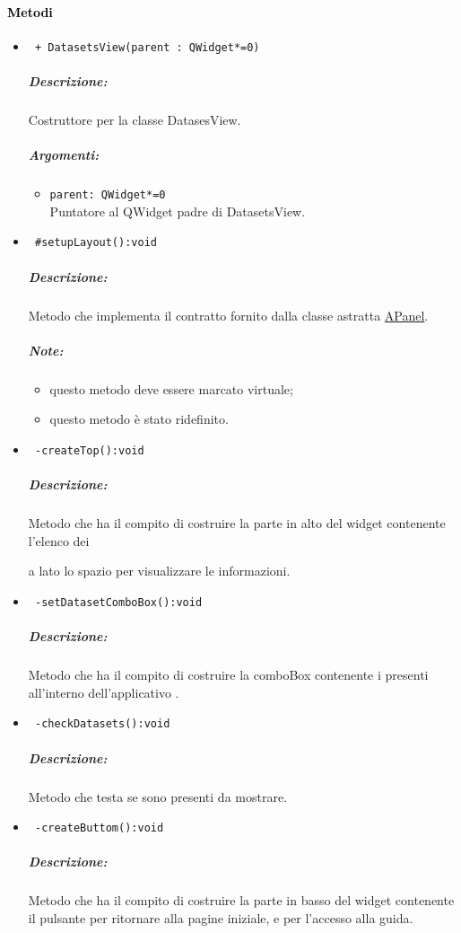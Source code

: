\paragraph{\textcolor{black}{Metodi\\}}
\begin{itemize}
\item\color{blue}\verb! + DatasetsView(parent : QWidget*=0)!
\subparagraph{Descrizione:}
\color{black}Costruttore per la classe DatasesView. 
\subparagraph{Argomenti:}
\begin{itemize}
\item \color{RoyalPurple}\verb!parent: QWidget*=0  !\\ Puntatore al QWidget padre di DatasetsView.
\end{itemize}

\item\color{blue}\verb! #setupLayout():void!
\color{black}
\subparagraph{Descrizione:} Metodo che implementa il contratto fornito dalla classe astratta \hyperref[speAPanel]{APanel}.
\subparagraph{Note:}
\begin{itemize}
\item questo metodo deve essere marcato virtuale;
\item questo metodo è stato ridefinito.
\end{itemize}
 
\item\color{blue}\verb! -createTop():void!
\color{black}
\subparagraph{Descrizione:} Metodo che ha il compito di costruire la parte in alto del widget contenente l'elenco dei \subject e a lato lo spazio per visualizzare le informazioni.
 
\item\color{blue}\verb! -setDatasetComboBox():void!
\color{black}
\subparagraph{Descrizione:} Metodo che ha il compito di costruire la comboBox contenente i \dataset{} presenti all'interno dell'applicativo \project. 
 
\item\color{blue}\verb! -checkDatasets():void!
\color{black}
\subparagraph{Descrizione:} Metodo che testa se sono presenti \dataset{} da mostrare.  
 
\item\color{blue}\verb! -createButtom():void!
\color{black}
\subparagraph{Descrizione:} Metodo che ha il compito di costruire la parte in basso del widget contenente il pulsante per ritornare alla pagine iniziale, e per l'accesso alla guida.


\end{itemize}
